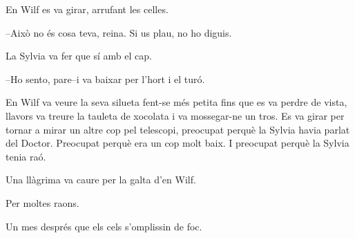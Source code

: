 En Wilf es va girar, arrufant les celles.

--Això no és cosa teva, reina. Si us plau, no ho diguis.

La Sylvia va fer que sí amb el cap.

--Ho sento, pare--i va baixar per l'hort i el turó.

En Wilf va veure la seva silueta fent-se més petita fins que es va
perdre de vista, llavors va treure la tauleta de xocolata i va
mossegar-ne un tros. Es va girar per tornar a mirar un altre cop pel
telescopi, preocupat perquè la Sylvia havia parlat del Doctor. Preocupat
perquè era un cop molt baix. I preocupat perquè la Sylvia tenia raó.

Una llàgrima va caure per la galta d'en Wilf.

Per moltes raons.

Un mes després que els cels s'omplissin de foc.